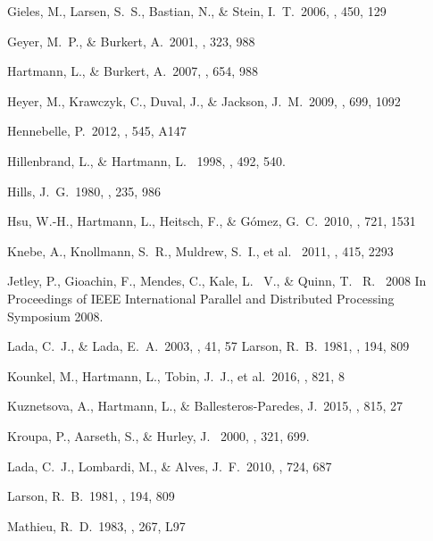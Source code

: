 \documentclass[iop]{emulateapj}
\begin{document}
\begin{thebibliography}
 Gieles, M., Larsen, S.~S., Bastian, N., \& Stein, I.~T.\ 2006, \aap, 450, 129 

 Geyer, M.~P., \& Burkert, A.\ 2001, \mnras, 323, 988 


 Hartmann, L., \& Burkert, A.\ 2007, \apj, 654, 988 

 Heyer, M., Krawczyk, C., 
Duval, J., \& Jackson, J.~M.\ 2009, \apj, 699, 1092 

 Hennebelle, P.\ 2012, \aap, 545, A147 


 Hillenbrand, L., \& Hartmann, L. \ 1998, \apj, 492, 540.

 Hills, J.~G.\ 1980, \apj, 235, 
986

 Hsu, W.-H., Hartmann, L., 
Heitsch, F., \& G{\'o}mez, G.~C.\ 2010, \apj, 721, 1531 


 Knebe, A., Knollmann, S.~R., Muldrew, S.~I., et al. \ 2011, \mnras, 415, 2293


 Jetley, P., Gioachin, F.,  Mendes, C., Kale, L. ~V., \& Quinn, T. ~R. \ 2008  In Proceedings of IEEE International Parallel and Distributed Processing Symposium 2008.


 Lada, C.~J., \& Lada, E.~A.\ 2003, \araa, 41, 57 
 Larson, R.~B.\ 1981, \mnras, 194, 809 

 Kounkel, M., Hartmann, L., Tobin, J.~J., et al.\ 2016, \apj, 821, 8 

 Kuznetsova, A., Hartmann, L., \& Ballesteros-Paredes, J.\ 2015, \apj, 815, 27 

 Kroupa, P., Aarseth, S., \& Hurley, J. \ 2000, \mnras, 321, 699. 



 Lada, C.~J., Lombardi, M.,
\& Alves, J.~F.\ 2010, \apj, 724, 687

 Larson, R.~B.\ 1981, \mnras, 194, 809



 Mathieu, R.~D.\ 1983, \apjl, 
267, L97 


\end{thebibliography}
\end{document}

